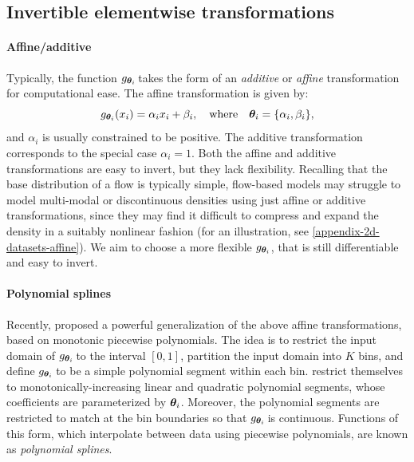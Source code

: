 \subsection{Invertible elementwise transformations}
\label{sec:invertible-elementwise-transformations} 
\paragraph{Affine/additive} Typically, the function $ g_{\bm{\theta}_i} \!$ takes the form of an \textit{additive} \citep{Dinh:2015:nice} or \textit{affine} \citep{Dinh:2017:rnvp} transformation for computational ease. The affine transformation is given by:
\begin{equation}
    g_{\bm{\theta}_i}(x_i) = \alpha_i x_i + \beta_i,
    \quad\text{where}\quad
    \bm{\theta}_i = \mathopen{}\left\lbrace\alpha_{i}, \beta_{i}\right\rbrace\mathclose{}, 
\end{equation}
and $ \alpha_i $ is usually constrained to be positive. 
The additive transformation corresponds to the special case $\alpha_i\!=\!1$.
Both the affine and additive transformations are easy to invert, but they lack flexibility.
Recalling that the base distribution of a flow is typically simple, flow-based models may struggle to model multi-modal or discontinuous densities using just affine or additive transformations, since they may find it difficult to compress and expand the density in a suitably nonlinear fashion (for an illustration, see \cref{appendix-2d-datasets-affine}). 
We aim to choose a more flexible $g_{\bm{\theta}_i} $, that is still differentiable
and easy to invert.

\paragraph{Polynomial splines} Recently, \citet{Muller:2018:nis} proposed a powerful generalization of the above affine transformations, based on monotonic piecewise polynomials. 
The idea is to restrict the input domain of $g_{\bm{\theta}_i}\! $ to the interval $ [0, 1] $, partition the input domain into $ K $ bins, and define $ g_{\bm{\theta}_i}\! $ to be a simple polynomial segment within each bin. 
\citet{Muller:2018:nis} restrict themselves to monotonically-increasing linear and quadratic polynomial segments, whose coefficients are parameterized by $\bm{\theta}_i$. 
Moreover, the polynomial segments are restricted to match at the bin boundaries so that  $g_{\bm{\theta}_i} \!$ is continuous. Functions of this form, which interpolate between data using piecewise polynomials, are known as \emph{polynomial splines}.

